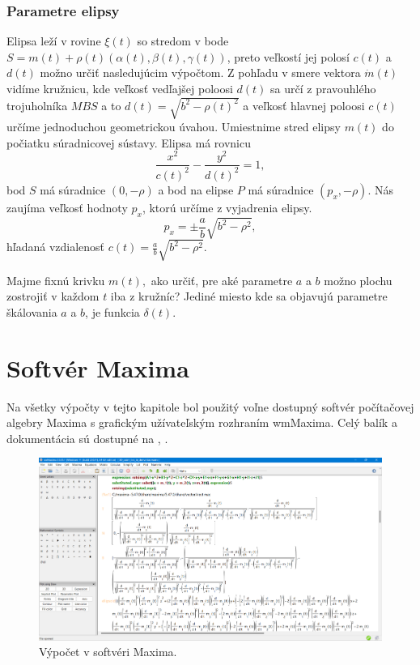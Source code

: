\subsubsection*{Parametre elipsy}
Elipsa leží v rovine $\xi(t) $ so stredom v bode $S = m(t) + \rho(t)(\alpha(t), \beta(t), \gamma(t))$,  preto veľkostí jej polosí $c(t)$ a $d(t)$ možno určiť nasledujúcim výpočtom.
Z pohľadu v smere vektora $\dot{m}(t)$ vidíme kružnicu, kde veľkosť vedľajšej poloosi $d(t)$ sa určí z pravouhlého trojuholníka $MBS$ a to
$d(t) = \sqrt{b^2 - \rho(t)^2}$
a veľkosť hlavnej poloosi $c(t)$ určíme jednoduchou geometrickou úvahou. Umiestnime stred elipsy $m(t)$ do počiatku súradnicovej sústavy. Elipsa má rovnicu 
$$
\frac{x^2}{c(t)^2} - \frac{y^2}{d(t)^2} = 1,
$$
bod $S$ má súradnice $(0, -\rho)$ a bod na elipse $P$ má súradnice $(p_x, -\rho)$. Nás zaujíma veľkosť hodnoty $p_x$, ktorú určíme z vyjadrenia elipsy.
$$
p_x = \pm \frac{a}{b} \sqrt{b^2 - \rho^2},
$$
hľadaná vzdialenosť $c(t) = \frac{a}{b} \sqrt{b^2 - \rho^2}.$

Majme fixnú krivku $m(t),$ ako určiť, pre aké parametre $a$ a $b$ možno plochu zostrojiť v každom $t$ iba z kružníc? Jediné miesto kde sa objavujú parametre škálovania $a$ a $b$, je funkcia $\delta (t).$

\section{Softvér Maxima}
Na všetky výpočty v tejto kapitole bol použitý voľne dostupný softvér počítačovej algebry Maxima s grafickým užívateľským rozhraním wmMaxima. Celý balík a dokumentácia sú dostupné na \cite{MaximaDoc}, \cite{MaximaDownload}.

\begin{figure}[h]
	\centering
	\includegraphics[width=\textwidth]{images/maxima.png}
	\caption[Softvér Maxima.]{Výpočet v softvéri Maxima.}
	\label{fig:3D_point_lies}
\end{figure}

